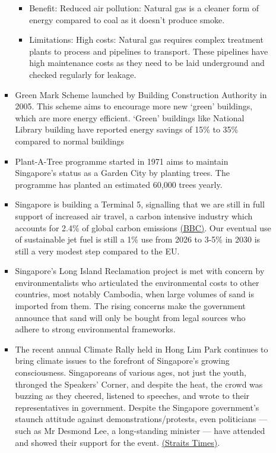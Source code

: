 \documentclass[oneside]{book}
\begin{document}
\begin{enumerate}
\begin{itemize}
\begin{itemize}
\begin{itemize}
                \item Benefit: Reduced air pollution: Natural gas is a cleaner form of energy compared to coal as it doesn't produce smoke.
                \item Limitations: High costs: Natural gas requires complex treatment plants to process and pipelines to transport. These pipelines have high maintenance costs as they need to be laid underground and checked regularly for leakage. 
            \end{itemize}
            \item Green Mark Scheme launched by Building Construction Authority in 2005. This scheme aims to encourage more new `green' buildings, which are more energy efficient. `Green' buildings like National Library building have reported energy savings of 15\% to 35\% compared to normal buildings
            \item Plant-A-Tree programme started in 1971 aims to maintain Singapore's status as a Garden City by planting trees. The programme has planted an estimated 60,000 trees yearly.
            \item Singapore is building a Terminal 5, signalling that we are still in full support of increased air travel, a carbon intensive industry which accounts for 2.4\% of global carbon emissions \href{https://www.bbc.com/future/article/20200218-climate-change-how-to-cut-your-carbon-emissions-when-flying}{(BBC)}. Our eventual use of sustainable jet fuel is still a 1\% use from 2026 to 3-5\% in 2030 is still a very modest step compared to the EU.
            \item Singapore's Long Island Reclamation project is met with concern by environmentalists who
            articulated the environmental costs to other countries, most notably Cambodia, when large volumes of sand is imported from them. The rising concerns make the government announce that sand will only be bought from legal sources who adhere to strong environmental frameworks.
            \item The recent annual Climate Rally held in Hong Lim Park continues to bring climate issues to the forefront of Singapore's growing consciousness. Singaporeans of various ages, not just the youth, thronged the Speakers' Corner, and despite the heat, the crowd was buzzing as they cheered, listened to speeches, and wrote to their representatives in government. Despite the Singapore government's staunch attitude against demonstrations/protests, even politicians --- such as Mr Desmond Lee, a long-standing minister --- have attended and showed their support for the event. \href{https://www.straitstimes.com/singapore/environment/hundreds-turn-up-in-red-at-hong-lim-park-for-first-singapore-climate-rally}{(Straits Times)}.

\end{itemize}
\end{itemize}
\end{enumerate}
\end{document}
